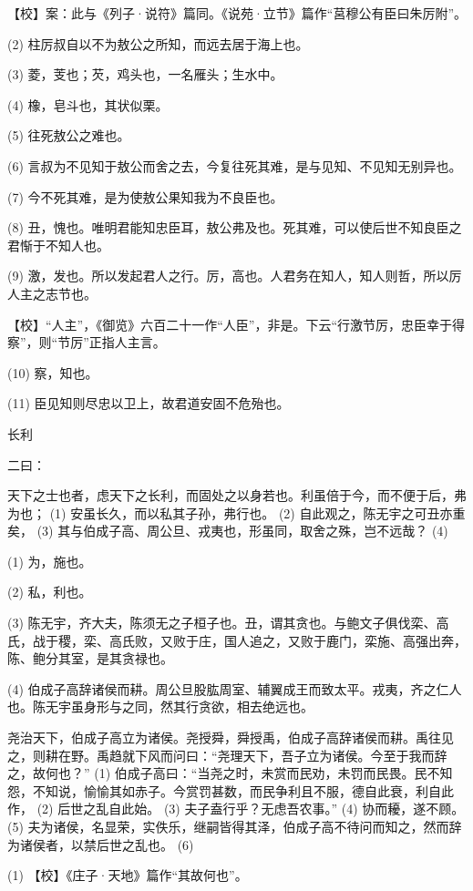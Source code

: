 \documentclass[12pt,UTF8]{ctexbook}
\begin{document}
【校】案：此与《列子·说符》篇同。《说苑·立节》篇作“莒穆公有臣曰朱厉附”。

(2) 柱厉叔自以不为敖公之所知，而远去居于海上也。

(3) 菱，芰也；芡，鸡头也，一名雁头；生水中。

(4) 橡，皂斗也，其状似栗。

(5) 往死敖公之难也。

(6) 言叔为不见知于敖公而舍之去，今复往死其难，是与见知、不见知无别异也。

(7) 今不死其难，是为使敖公果知我为不良臣也。

(8) 丑，愧也。唯明君能知忠臣耳，敖公弗及也。死其难，可以使后世不知良臣之君惭于不知人也。

(9) 激，发也。所以发起君人之行。厉，高也。人君务在知人，知人则哲，所以厉人主之志节也。

【校】“人主”，《御览》六百二十一作“人臣”，非是。下云“行激节厉，忠臣幸于得察”，则“节厉”正指人主言。

(10) 察，知也。

(11) 臣见知则尽忠以卫上，故君道安固不危殆也。





长利


二曰：

天下之士也者，虑天下之长利，而固处之以身若也。利虽倍于今，而不便于后，弗为也； (1) 安虽长久，而以私其子孙，弗行也。 (2) 自此观之，陈无宇之可丑亦重矣， (3) 其与伯成子高、周公旦、戎夷也，形虽同，取舍之殊，岂不远哉？ (4)

(1) 为，施也。

(2) 私，利也。

(3) 陈无宇，齐大夫，陈须无之子桓子也。丑，谓其贪也。与鲍文子俱伐栾、高氏，战于稷，栾、高氏败，又败于庄，国人追之，又败于鹿门，栾施、高强出奔，陈、鲍分其室，是其贪禄也。

(4) 伯成子高辞诸侯而耕。周公旦股肱周室、辅翼成王而致太平。戎夷，齐之仁人也。陈无宇虽身形与之同，然其行贪欲，相去绝远也。

尧治天下，伯成子高立为诸侯。尧授舜，舜授禹，伯成子高辞诸侯而耕。禹往见之，则耕在野。禹趋就下风而问曰：“尧理天下，吾子立为诸侯。今至于我而辞之，故何也？” (1) 伯成子高曰：“当尧之时，未赏而民劝，未罚而民畏。民不知怨，不知说，愉愉其如赤子。今赏罚甚数，而民争利且不服，德自此衰，利自此作， (2) 后世之乱自此始。 (3) 夫子盍行乎？无虑吾农事。” (4) 协而耰，遂不顾。 (5) 夫为诸侯，名显荣，实佚乐，继嗣皆得其泽，伯成子高不待问而知之，然而辞为诸侯者，以禁后世之乱也。 (6)

(1) 【校】《庄子·天地》篇作“其故何也”。
\end{document}
